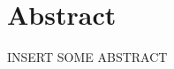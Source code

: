 \documentclass[a4paper,man,floatsintext,natbib,donotrepeattitle]{apa6}
\begin{document}

\section{Abstract}
INSERT SOME ABSTRACT


\end{document}
